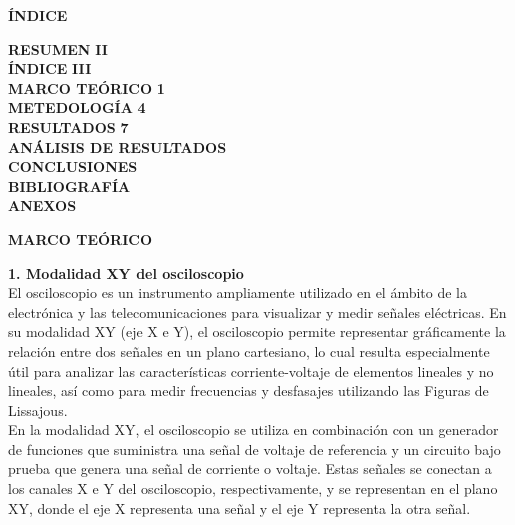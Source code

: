 \documentclass[12pt]{article}
\begin{document}
	\newpage
	
	\begin{center}
		\textbf{\large ÍNDICE}\\
	\end{center}
	
	\noindent \textbf{RESUMEN} \hfill \textbf{II}\\
	\noindent \textbf{ÍNDICE} \hfill \textbf{III}\\
	\noindent \textbf{MARCO TEÓRICO} \hfill \textbf{1}\\
	\noindent \textbf{METEDOLOGÍA} \hfill \textbf{4}\\
	\noindent \textbf{RESULTADOS} \hfill \textbf{7}\\
	\noindent \textbf{ANÁLISIS DE RESULTADOS} \hfill \textbf{}\\
	\noindent \textbf{CONCLUSIONES} \hfill \textbf{}\\
	\noindent \textbf{BIBLIOGRAFÍA} \hfill \textbf{}\\
	\noindent \textbf{ANEXOS} \hfill \textbf{}\\
	
	\newpage
	
	
	\begin{center}
		\textbf{\large MARCO TEÓRICO}\\
	\end{center}
		
	\textbf{1. Modalidad XY del osciloscopio}\\
	
	El osciloscopio es un instrumento ampliamente utilizado en el ámbito de la electrónica y las telecomunicaciones para visualizar y medir señales eléctricas. En su modalidad XY (eje X e Y), el osciloscopio permite representar gráficamente la relación entre dos señales en un plano cartesiano, lo cual resulta especialmente útil para analizar las características corriente-voltaje de elementos lineales y no lineales, así como para medir frecuencias y desfasajes utilizando las Figuras de Lissajous.\\
	
	En la modalidad XY, el osciloscopio se utiliza en combinación con un generador de funciones que suministra una señal de voltaje de referencia y un circuito bajo prueba que genera una señal de corriente o voltaje. Estas señales se conectan a los canales X e Y del osciloscopio, respectivamente, y se representan en el plano XY, donde el eje X representa una señal y el eje Y representa la otra señal.\\
	
\end{document}
